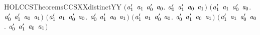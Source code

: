 \begin{SaveVerbatim}{HOLCCSTheoremsCCSXXdistinctYY}
   \ensuremath{(}\HOLSymConst{\HOLTokenForall{}}\ensuremath{\HOLBoundVar{a}\sb{\mathrm{1}}\sp{\prime{}}} \ensuremath{\HOLBoundVar{a}\sb{\mathrm{1}}} \ensuremath{\HOLBoundVar{a}\sb{\mathrm{0}}\sp{\prime{}}} \ensuremath{\HOLBoundVar{a}\sb{\mathrm{0}}}.  \ensuremath{\HOLBoundVar{a}\sb{\mathrm{0}}\sp{\prime{}}} \ensuremath{\HOLBoundVar{a}\sb{\mathrm{1}}\sp{\prime{}}} \HOLSymConst{\HOLTokenNotEqual{}} \ensuremath{\HOLBoundVar{a}\sb{\mathrm{0}}} \HOLSymConst{\ensuremath{\mid}} \ensuremath{\HOLBoundVar{a}\sb{\mathrm{1}}}\ensuremath{)} \HOLSymConst{\HOLTokenConj{}}
   \ensuremath{(}\HOLSymConst{\HOLTokenForall{}}\ensuremath{\HOLBoundVar{a}\sb{\mathrm{1}}\sp{\prime{}}} \ensuremath{\HOLBoundVar{a}\sb{\mathrm{1}}} \ensuremath{\HOLBoundVar{a}\sb{\mathrm{0}}\sp{\prime{}}} \ensuremath{\HOLBoundVar{a}\sb{\mathrm{0}}}.  \ensuremath{\HOLBoundVar{a}\sb{\mathrm{0}}\sp{\prime{}}} \ensuremath{\HOLBoundVar{a}\sb{\mathrm{1}}\sp{\prime{}}} \HOLSymConst{\HOLTokenNotEqual{}} \ensuremath{\HOLBoundVar{a}\sb{\mathrm{0}}} \HOLSymConst{\ensuremath{\mid}} \ensuremath{\HOLBoundVar{a}\sb{\mathrm{1}}}\ensuremath{)} \HOLSymConst{\HOLTokenConj{}}
   \ensuremath{(}\HOLSymConst{\HOLTokenForall{}}\ensuremath{\HOLBoundVar{a}\sb{\mathrm{1}}\sp{\prime{}}} \ensuremath{\HOLBoundVar{a}\sb{\mathrm{1}}} \ensuremath{\HOLBoundVar{a}\sb{\mathrm{0}}\sp{\prime{}}} \ensuremath{\HOLBoundVar{a}\sb{\mathrm{0}}}.  \ensuremath{\HOLBoundVar{a}\sb{\mathrm{0}}\sp{\prime{}}} \ensuremath{\HOLBoundVar{a}\sb{\mathrm{1}}\sp{\prime{}}} \HOLSymConst{\HOLTokenNotEqual{}} \ensuremath{\HOLBoundVar{a}\sb{\mathrm{0}}} \HOLSymConst{\ensuremath{\mid}} \ensuremath{\HOLBoundVar{a}\sb{\mathrm{1}}}\ensuremath{)} \HOLSymConst{\HOLTokenConj{}}
   \ensuremath{(}\HOLSymConst{\HOLTokenForall{}}\ensuremath{\HOLBoundVar{a}\sb{\mathrm{1}}\sp{\prime{}}} \ensuremath{\HOLBoundVar{a}\sb{\mathrm{1}}} \ensuremath{\HOLBoundVar{a}\sb{\mathrm{0}}\sp{\prime{}}} \ensuremath{\HOLBoundVar{a}\sb{\mathrm{0}}}.  \ensuremath{\HOLBoundVar{a}\sb{\mathrm{0}}\sp{\prime{}}} \ensuremath{\HOLBoundVar{a}\sb{\mathrm{1}}\sp{\prime{}}} \HOLSymConst{\HOLTokenNotEqual{}}  \ensuremath{\HOLBoundVar{a}\sb{\mathrm{0}}} \ensuremath{\HOLBoundVar{a}\sb{\mathrm{1}}}\ensuremath{)} \HOLSymConst{\HOLTokenConj{}}
   \ensuremath{(}\HOLSymConst{\HOLTokenForall{}}\ensuremath{\HOLBoundVar{a}\sb{\mathrm{1}}\sp{\prime{}}} \ensuremath{\HOLBoundVar{a}\sb{\mathrm{1}}} \ensuremath{\HOLBoundVar{a}\sb{\mathrm{0}}\sp{\prime{}}} \ensuremath{\HOLBoundVar{a}\sb{\mathrm{0}}}.  \ensuremath{\HOLBoundVar{a}\sb{\mathrm{0}}\sp{\prime{}}} \ensuremath{\HOLBoundVar{a}\sb{\mathrm{1}}\sp{\prime{}}} \HOLSymConst{\HOLTokenNotEqual{}}  \ensuremath{\HOLBoundVar{a}\sb{\mathrm{0}}} \ensuremath{\HOLBoundVar{a}\sb{\mathrm{1}}}\ensuremath{)} \HOLSymConst{\HOLTokenConj{}}

\end{SaveVerbatim}
